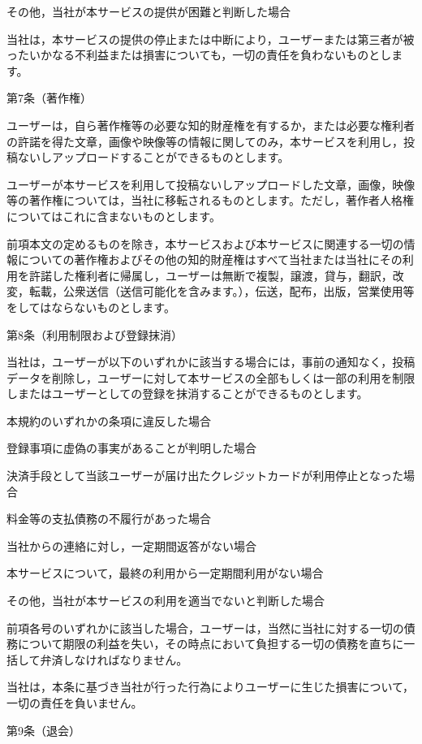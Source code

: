         その他，当社が本サービスの提供が困難と判断した場合

    当社は，本サービスの提供の停止または中断により，ユーザーまたは第三者が被ったいかなる不利益または損害についても，一切の責任を負わないものとします。

第7条（著作権）

    ユーザーは，自ら著作権等の必要な知的財産権を有するか，または必要な権利者の許諾を得た文章，画像や映像等の情報に関してのみ，本サービスを利用し，投稿ないしアップロードすることができるものとします。

    ユーザーが本サービスを利用して投稿ないしアップロードした文章，画像，映像等の著作権については，当社に移転されるものとします。ただし，著作者人格権についてはこれに含まないものとします。

    前項本文の定めるものを除き，本サービスおよび本サービスに関連する一切の情報についての著作権およびその他の知的財産権はすべて当社または当社にその利用を許諾した権利者に帰属し，ユーザーは無断で複製，譲渡，貸与，翻訳，改変，転載，公衆送信（送信可能化を含みます。），伝送，配布，出版，営業使用等をしてはならないものとします。

第8条（利用制限および登録抹消）

    当社は，ユーザーが以下のいずれかに該当する場合には，事前の通知なく，投稿データを削除し，ユーザーに対して本サービスの全部もしくは一部の利用を制限しまたはユーザーとしての登録を抹消することができるものとします。

        本規約のいずれかの条項に違反した場合

        登録事項に虚偽の事実があることが判明した場合

        決済手段として当該ユーザーが届け出たクレジットカードが利用停止となった場合

        料金等の支払債務の不履行があった場合

        当社からの連絡に対し，一定期間返答がない場合

        本サービスについて，最終の利用から一定期間利用がない場合

        その他，当社が本サービスの利用を適当でないと判断した場合

    前項各号のいずれかに該当した場合，ユーザーは，当然に当社に対する一切の債務について期限の利益を失い，その時点において負担する一切の債務を直ちに一括して弁済しなければなりません。

    当社は，本条に基づき当社が行った行為によりユーザーに生じた損害について，一切の責任を負いません。

第9条（退会）

